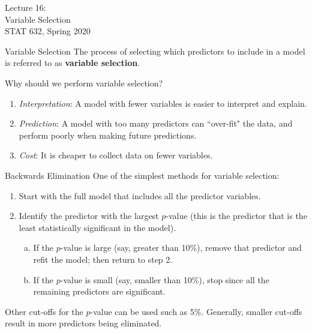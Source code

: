 \documentclass[10pt]{beamer}\usepackage[]{graphicx}\usepackage[]{color}
\begin{document}
\begin{frame}
\large
Lecture 16:\\ 
Variable Selection\\
STAT 632, Spring 2020\\
\end{frame}

\begin{frame}{Variable Selection}
The process of selecting which predictors to include in a model is referred to as \textbf{variable selection}.\\
\vspace{10pt}

Why should we perform variable selection?
\begin{enumerate}[(1)]
\item \emph{Interpretation}:  A model with fewer variables is easier to interpret and explain.
\vspace{5pt}
\item \emph{Prediction}:  A model with too many predictors can ``over-fit" the data, and perform poorly when making future predictions.
\vspace{5pt}
\item \emph{Cost}: It is cheaper to collect data on fewer variables.
\end{enumerate}
\end{frame}


\begin{frame}{Backwards Elimination}
One of the simplest methods for variable selection:
\vspace{5pt}
\begin{enumerate}[(1)]
\item Start with the full model that includes all the predictor variables.
\vspace{5pt}
\item Identify the predictor with the largest $p$-value (this is the predictor that is the least statistically significant in the model).
\vspace{5pt}
\begin{enumerate}[(a)]
\item If the $p$-value is large (say, greater than 10\%), remove that predictor and refit the model; then return to step 2.
\vspace{5pt}
\item If the $p$-value is small (say, smaller than 10\%), stop since all the remaining predictors are significant.
\end{enumerate}
\end{enumerate}
\vspace{5pt}
Other cut-offs for the $p$-value can be used such as 5\%.  Generally, smaller cut-offs result in more predictors being eliminated.
\end{frame}
\end{document}
